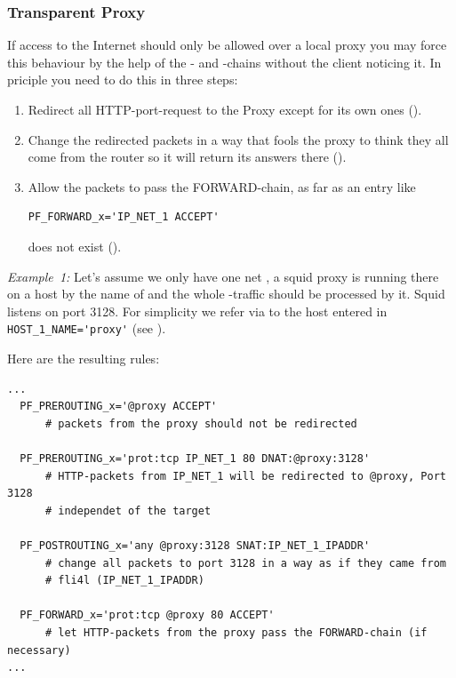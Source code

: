 \subsubsection{Transparent Proxy}
If access to the Internet should only be allowed over a local proxy
you may force this behaviour by the help of the - and
-chains without the client noticing it.
In priciple you need to do this in three steps:

\begin{enumerate}
\item Redirect all HTTP-port-request to the Proxy except for its own ones
().
\item Change the redirected packets in a way that fools the proxy to think they
all come from the router so it will return its answers there
().
\item Allow the packets to pass the FORWARD-chain, as far as an entry like

\begin{example}
\begin{verbatim}
PF_FORWARD_x='IP_NET_1 ACCEPT'
\end{verbatim}
\end{example}
does not exist ().
\end{enumerate}

\emph{Example~1:} Let's assume we only have one net ,
a squid proxy is running there on a host by the name of  and
the whole -traffic should be processed by it. Squid listens
on port 3128. For simplicity we refer via  to the host
entered in \verb+HOST_1_NAME='proxy'+ (see
).

Here are the resulting rules:

\begin{example}
\begin{verbatim}
...
  PF_PREROUTING_x='@proxy ACCEPT'
      # packets from the proxy should not be redirected

  PF_PREROUTING_x='prot:tcp IP_NET_1 80 DNAT:@proxy:3128'
      # HTTP-packets from IP_NET_1 will be redirected to @proxy, Port 3128
      # independet of the target

  PF_POSTROUTING_x='any @proxy:3128 SNAT:IP_NET_1_IPADDR'
      # change all packets to port 3128 in a way as if they came from
      # fli4l (IP_NET_1_IPADDR)

  PF_FORWARD_x='prot:tcp @proxy 80 ACCEPT'
      # let HTTP-packets from the proxy pass the FORWARD-chain (if necessary)
...
\end{verbatim}
\end{example}

